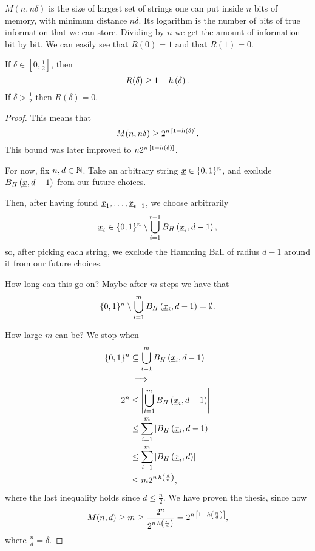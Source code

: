 $M(n, n \delta)$ is the size of largest set of strings one can put inside $n$ bits of memory, with minimum distance $n \delta$.
Its logarithm is the number of bits of true information that we can store.
Dividing by $n$ we get the amount of information bit by bit.
We can easily see that $R(0) = 1$ and that $R(1) = 0$.

\begin{thm}
	If $\delta \in \left[ 0, \frac{1}{2} \right]$, then
	\begin{equation*}
		R(\delta) \ge 1 - h\left({\delta}\right).
	\end{equation*}
	If $\delta > \frac{1}{2}$ then $R(\delta) = 0$.
\end{thm}

\begin{proof}
	This means that
	\begin{equation*}
		M(n, n \delta) \ge 2^{n \, \left[1 - h\left({\delta}\right) \right]}.
	\end{equation*}
	This bound was later improved to $n 2^{n \, \left[1 - h\left({\delta}\right) \right]}$.

	For now, fix $n, d \in \mathbb{N}$.
	Take an arbitrary string $\underline{x} \in \{0, 1\}^n$, and exclude $B_H\left(\underline{x}, d-1\right)$ from our future choices.

	Then, after having found $\underline{x}_1, \dots, \underline{x}_{t-1}$, we choose arbitrarily
	\begin{equation*}
		\underline{x}_t \in \{0, 1\}^n \setminus \bigcup_{i = 1}^{t-1} B_H\left(\underline{x}_i, d-1\right),
	\end{equation*}
	so, after picking each string, we exclude the Hamming Ball of radius $d-1$ around it from our future choices.

	How long can this go on?
	Maybe after $m$ steps we have that
	\begin{equation*}
		\{0, 1\}^n \setminus \bigcup_{i = 1}^{m} B_H\left(\underline{x}_i, d-1\right) = \emptyset.
	\end{equation*}

	How large $m$ can be?
	We stop when 
	\begin{align*}
		\{0, 1\}^n
		& \subseteq
		\bigcup_{i = 1}^{m} B_H\left(\underline{x}_i, d-1\right)
		\\
		& \implies
		\\
		2^n
		& \le
		\left|{\bigcup_{i = 1}^{m} B_H\left(\underline{x}_i, d-1\right)}\right|
		\\
		& \le
		\sum_{i = 1}^m \left|{B_H\left(\underline{x}_i, d-1\right)}\right|
		\\
		& \le
		\sum_{i = 1}^m \left|{B_H\left(\underline{x}_i, d\right)}\right|
		\\
		& \le
		m 2^{n \, h\left({\frac{d}{n}}\right)},
	\end{align*}
	where the last inequality holds since $d \le \frac{n}{2}$.
	We have proven the thesis, since now
	\begin{equation*}
		M(n, d) \ge m \ge \frac{2^n}{2^{n \, h\left({\frac{n}{d}}\right)}}
		=
		2^{n \, \left[ 1 - h\left({\frac{n}{d}}\right) \right]},
	\end{equation*}
	where $\frac{n}{d} = \delta.$
\end{proof}

